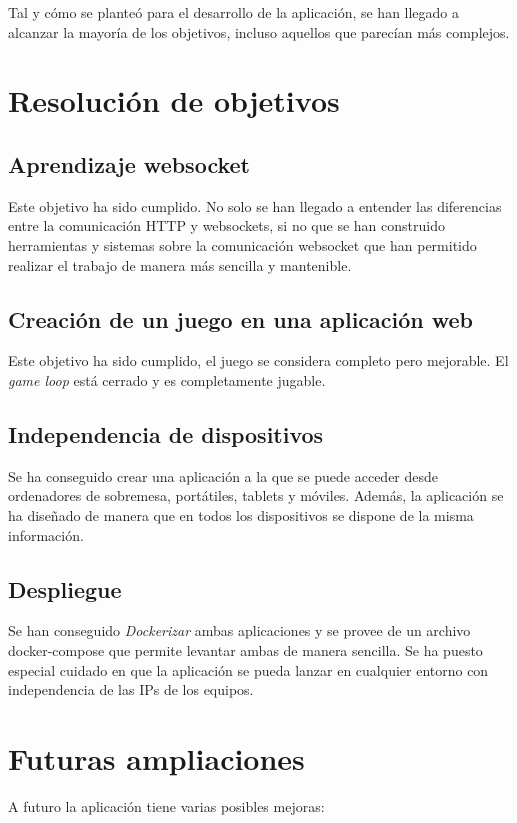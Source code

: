 Tal y cómo se planteó para el desarrollo de la aplicación, se han llegado a alcanzar la mayoría de los objetivos, incluso aquellos que parecían más complejos.

\section{Resolución de objetivos}

\subsection{Aprendizaje websocket}
Este objetivo ha sido cumplido. No solo se han llegado a entender las diferencias entre la comunicación HTTP y websockets, si no que se han construido herramientas y sistemas sobre la comunicación websocket que han permitido realizar el trabajo de manera más sencilla y mantenible.

\subsection{Creación de un juego en una aplicación web}
Este objetivo ha sido cumplido, el juego se considera completo pero mejorable. El \textit{game loop} está cerrado y es completamente jugable.

\subsection{Independencia de dispositivos}
Se ha conseguido crear una aplicación a la que se puede acceder desde ordenadores de sobremesa, portátiles, tablets y móviles. Además, la aplicación se ha diseñado de manera que en todos los dispositivos se dispone de la misma información.

\subsection{Despliegue}
Se han conseguido \textit{Dockerizar} ambas aplicaciones y se provee de un archivo docker-compose que permite levantar ambas de manera sencilla. Se ha puesto especial cuidado en que la aplicación se pueda lanzar en cualquier entorno con independencia de las IPs de los equipos.

\section{Futuras ampliaciones}
A futuro la aplicación tiene varias posibles mejoras:

